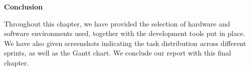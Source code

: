 \clearpage
\begin{center}
    \doublespacing 
    \centering
    \LARGE\textbf{Conclusion} 
    \vspace{1cm} \\
    \raggedright
\end{center}
Throughout this chapter, we have provided the selection of hardware and software environments used, together with the development tools put in place. 
We have also given screenshots indicating the task distribution across different sprints, as well as the Gantt chart. We conclude our report with this final chapter.